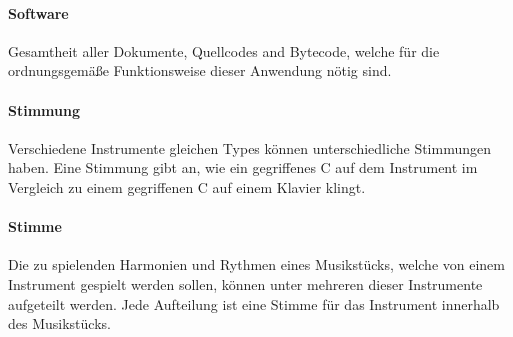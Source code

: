 \documentclass[a4paper,10pt]{scrartcl}
\begin{document}
\paragraph*{Software} Gesamtheit aller Dokumente, Quellcodes and Bytecode, welche für die ordnungsgemäße Funktionsweise dieser Anwendung nötig sind.
\paragraph*{Stimmung} Verschiedene Instrumente gleichen Types können unterschiedliche Stimmungen haben. Eine Stimmung gibt an, wie ein gegriffenes C auf dem Instrument im Vergleich zu einem gegriffenen C auf einem Klavier klingt.
\paragraph*{Stimme} Die zu spielenden Harmonien und Rythmen eines Musikstücks, welche von einem Instrument gespielt werden sollen, können unter mehreren dieser Instrumente aufgeteilt werden. Jede Aufteilung ist eine Stimme für das Instrument innerhalb des Musikstücks. 
\end{document}
